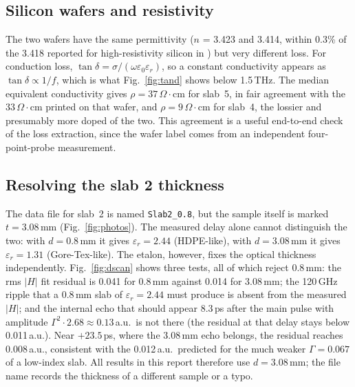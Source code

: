 \documentclass[conference]{IEEEtran}
\begin{document}
\subsection{Silicon wafers and resistivity}
The two wafers have the same permittivity ($n$ = 3.423 and 3.414, within 0.3\% of the 3.418 reported for high-resistivity silicon in \cite{grisch}) but very different loss. For conduction loss, $\tan\delta = \sigma/(\omega\varepsilon_0\varepsilon_r)$, so a constant conductivity appears as $\tan\delta \propto 1/f$, which is what Fig.~\ref{fig:tand} shows below 1.5\,THz. The median equivalent conductivity gives $\rho = 37$\,$\Omega\cdot$cm for slab~5, in fair agreement with the 33\,$\Omega\cdot$cm printed on that wafer, and $\rho = 9$\,$\Omega\cdot$cm for slab~4, the lossier and presumably more doped of the two. This agreement is a useful end-to-end check of the loss extraction, since the wafer label comes from an independent four-point-probe measurement.

\subsection{Resolving the slab 2 thickness}
\label{sec:slab2}
The data file for slab~2 is named \texttt{Slab2\_0.8}, but the sample itself is marked $t = 3.08$\,mm (Fig.~\ref{fig:photos}). The measured delay alone cannot distinguish the two: with $d=0.8$\,mm it gives $\varepsilon_r = 2.44$ (HDPE-like), with $d=3.08$\,mm it gives $\varepsilon_r = 1.31$ (Gore-Tex-like). The etalon, however, fixes the optical thickness independently. Fig.~\ref{fig:dscan} shows three tests, all of which reject 0.8\,mm: the rms $|H|$ fit residual is 0.041 for 0.8\,mm against 0.014 for 3.08\,mm; the 120\,GHz ripple that a 0.8\,mm slab of $\varepsilon_r=2.44$ must produce is absent from the measured $|H|$; and the internal echo that should appear 8.3\,ps after the main pulse with amplitude $\Gamma^2 \cdot 2.68 \approx 0.13$\,a.u.\ is not there (the residual at that delay stays below 0.011\,a.u.). Near $+23.5$\,ps, where the 3.08\,mm echo belongs, the residual reaches 0.008\,a.u., consistent with the 0.012\,a.u.\ predicted for the much weaker $\Gamma = 0.067$ of a low-index slab. All results in this report therefore use $d = 3.08$\,mm; the file name records the thickness of a different sample or a typo.
\end{document}
